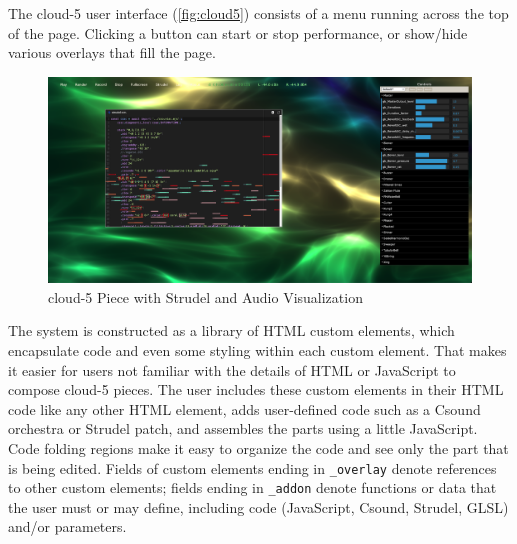 \documentclass[runningheads,a4paper]{llncs}
\begin{document}
The cloud-5 user interface (\autoref{fig:cloud5}) consists of a menu running across the top of the page. Clicking a button can start or stop performance, or show/hide various overlays that fill the page. 

\begin{figure}
\centering
\includegraphics[width=0.90\linewidth]{cloud5}
\caption{cloud-5 Piece with Strudel and Audio Visualization}
\label{fig:cloud5}
\end{figure}

The system is constructed as a library of HTML custom elements, which encapsulate code and even some styling within each custom element. That makes it easier for users not familiar with the details of HTML or JavaScript to compose cloud-5 pieces. The user includes these custom elements in their HTML code like any other HTML element, adds user-defined code such as a Csound orchestra or Strudel patch, and assembles the parts using a little JavaScript. Code folding regions make it easy to organize the code and see only the part that is being edited. Fields of custom elements ending in \texttt{\_overlay} denote references to other custom elements; fields ending in \texttt{\_addon} denote functions or data that the user must or may define, including code (JavaScript, Csound, Strudel, GLSL) and/or parameters.
\end{document}
